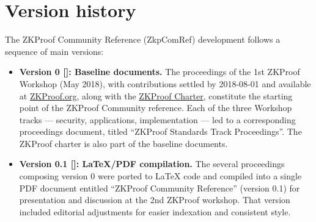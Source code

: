 \chapter{Version history}
\label{app:version-history}

The ZKProof Community Reference (ZkpComRef) development follows a sequence of main versions:
\loosen

\begin{itemize}\setlength{\itemsep}{.75em}

\item \textbf{Version 0 [\dateVersionZero]: Baseline documents.}
The proceedings of the 1st ZKProof Workshop (May 2018), with contributions settled by 2018-08-01 and available at \href{https://zkproof.org/documents}{ZKProof.org}, along with the \hyperref[sec:prelim:charter]{ZKProof Charter}, constitute the starting point of the ZKProof Community reference.
Each of the three Workshop tracks --- security, applications, implementation --- led to a corresponding proceedings document, titled ``ZKProof Standards  Track Proceedings''.
The ZKProof charter is also part of the baseline documents.


\item \textbf{Version 0.1 [\dateVersionZeroDotOne]: LaTeX/PDF compilation.}
The several proceedings composing version 0 were ported to LaTeX code and compiled into a single PDF document entitled ``ZKProof Community Reference'' (version 0.1) for presentation and discussion at the 2nd ZKProof workshop. 
That version included editorial adjustments for easier indexation and consistent style. 



\end{itemize}
